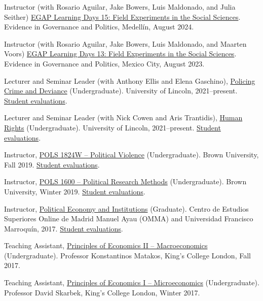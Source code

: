 \documentclass[a4paper]{article}
\renewenvironment{itemize}{
	\begin{list}{}{
			\setlength{\leftmargin}{1.5em}
		}
		}{
	\end{list}
}
\begin{document}
\begin{itemize}
\item Instructor (with Rosario Aguilar, Jake Bowers, Luis Maldonado, and Julia Seither) \href{https://egap.org/project/learning-days-15-latin-america-regional-hub-workshop/}{EGAP Learning Days 15: Field Experiments in the Social Sciences}. Evidence in Governance and Politics, Medellín, August 2024.
\item Instructor (with Rosario Aguilar, Jake Bowers, Luis Maldonado, and Maarten Voors) \href{https://egap.org/project/learning-days-13-latin-america-regional-hub-workshop/}{EGAP Learning Days 13: Field Experiments in the Social Sciences}. Evidence in Governance and Politics, Mexico City, August 2023.
\item Lecturer and Seminar Leader (with Anthony Ellis and Elena Gaschino), \href{https://blackboard.lincoln.ac.uk/ultra/courses/_182116_1/cl/outline}{Policing Crime and Deviance} (Undergraduate). University of Lincoln, 2021--present. \href{https://danilofreire.github.io/evaluations/eval-pcd-2023.xlsx}{Student evaluations}.
\item Lecturer and Seminar Leader (with Nick Cowen and Aris Trantidis), \href{https://blackboard.lincoln.ac.uk/ultra/courses/_184943_1/cl/outline}{Human Rights} (Undergraduate). University of Lincoln, 2021--present. \href{https://danilofreire.github.io/evaluations/eval-hr-2122.xlsx}{Student evaluations}.
\item Instructor, \href{https://danilofreire.github.io/pols1824w/}{POLS 1824W -- Political Violence} (Undergraduate). Brown University, Fall 2019. \href{https://danilofreire.github.io/evaluations/eval-pol-vio.pdf}{Student evaluations}.
\item Instructor, \href{https://pols1600.github.io/}{POLS 1600 -- Political Research Methods} (Undergraduate). Brown University, Winter 2019. \href{https://danilofreire.github.io/evaluations/eval-pol-meth.pdf}{Student evaluations}.
\item Instructor, \href{https://github.com/danilofreire/economia-politica-instituicoes-ufm}{Political Economy and Institutions} (Graduate). Centro de Estudios Superiores Online de Madrid Manuel Ayau (OMMA) and Universidad Francisco Marroquín, 2017. \href{https://danilofreire.github.io/evaluations/eval-ufm.pdf}{Student evaluations}.
\item Teaching Assistant, \href{https://github.com/danilofreire/core-econ}{Principles of Economics II -- Macroeconomics} (Undergraduate). Professor Konstantinos Matakos, King's College London, Fall 2017.
\item Teaching Assistant, \href{https://github.com/danilofreire/core-econ}{Principles of Economics I -- Microeconomics} (Undergraduate). Professor David Skarbek, King's College London, Winter 2017.
\end{itemize}
\end{document}

